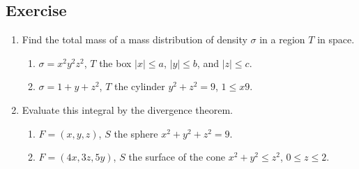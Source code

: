 \documentclass[aima331_lecturenotes_ku.tex]{subfiles}
\begin{document}
  \subsection{Exercise}
  \begin{enumerate}
  \item Find the total mass of a mass distribution of density $\sigma$ in a region $T$ in space.
    \begin{enumerate}
    \item $\sigma = x^2y^2z^2$, $T$ the box $|x| \leq a$, $|y| \leq b$, and $|z| \leq c$.
     \item $\sigma = 1 + y+z^2$, $T$ the cylinder $y^2+z^2=9$, $1 \leq x 9$.
     \end{enumerate}

   \item Evaluate this integral by the divergence theorem.
     \begin{enumerate}
     \item $F=(x,y,z)$, $S$ the sphere $x^2+y^2+z^2 =9$.

     \item $F=(4x, 3z, 5y)$, $S$ the surface of the cone $x^2+y^2 \leq z^2$, $0\leq z\leq 2$.
     \end{enumerate}
  \end{enumerate}
\end{document}
